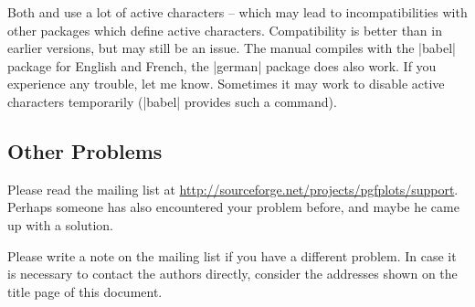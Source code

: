Both \PGF{} and \PGFPlots{} use a lot of active characters -- which may lead to
incompatibilities with other packages which define active characters.
Compatibility is better than in earlier versions, but may still be an issue.
The manual compiles with the |babel| package for English and French, the
|german| package does also work. If you experience any trouble, let me know.
Sometimes it may work to disable active characters temporarily (|babel|
provides such a command).


\subsection{Other Problems}

Please read the mailing list at
\url{http://sourceforge.net/projects/pgfplots/support}. Perhaps someone has
also encountered your problem before, and maybe he came up with a solution.

Please write a note on the mailing list if you have a different problem. In
case it is necessary to contact the authors directly, consider the addresses
shown on the title page of this document.
